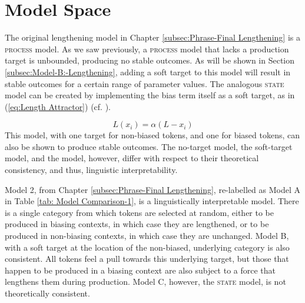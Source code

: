 \section{\label{sec:Model-Interpretation}Model Space}

The original lengthening model in Chapter \ref{subsec:Phrase-Final Lengthening}
is a \textsc{process} model. As we saw previously, a \textsc{process}
model that lacks a production target is unbounded, producing no stable
outcomes. As will be shown in Section \ref{subsec:Model-B:-Lengthening},
adding a soft target to this model will result in stable outcomes
for a certain range of parameter values. The analogous \textsc{state}
model can be created by implementing the bias term itself as a soft
target, as in (\ref{eq:Length Attractor}) (cf. \citealt{soskuthy2013phonetic}). 

\begin{equation}
L(x_{i})=\alpha(L-x_{i})\label{eq:Length Attractor}
\end{equation}
This model, with one target for non-biased tokens, and one for biased
tokens, can also be shown to produce stable outcomes. The no-target
 model, the soft-target  model, and the
 model, however, differ with respect to their theoretical
consistency, and thus, linguistic interpretability. 

Model 2, from Chapter \ref{subsec:Phrase-Final Lengthening}, re-labelled
as Model A in Table \ref{tab: Model Comparison-1}, is a linguistically
interpretable model. There is a single category from which tokens
are selected at random, either to be produced in biasing contexts,
in which case they are lengthened, or to be produced in non-biasing
contexts, in which case they are unchanged. Model B, with a soft target
at the location of the non-biased, underlying category is also consistent.
All tokens feel a pull towards this underlying target, but those that
happen to be produced in a biasing context are also subject to a force
that lengthens them during production. Model C, however, the \textsc{state}
model, is not theoretically consistent. 

\begin{table}[h]
\caption{Single-Category Model Space\label{tab: Model Comparison-1}}

%
\end{table}

